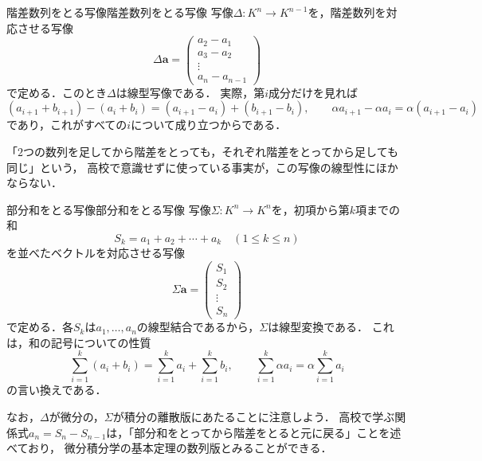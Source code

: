 \begin{example}{階差数列をとる写像}{階差数列をとる写像}
  写像$\Delta \colon K^n \to K^{n-1}$を，階差数列を対応させる写像
  \[
    \Delta \bm{a} =
    \begin{pmatrix}
      a_2 - a_1 \\ a_3 - a_2 \\ \vdots \\ a_n - a_{n-1}
    \end{pmatrix}
  \]
  で定める．このとき$\Delta$は線型写像である．
  実際，第$i$成分だけを見れば
  \[
    (a_{i+1} + b_{i+1}) - (a_i + b_i) = (a_{i+1} - a_i) + (b_{i+1} - b_i), \qquad
    \alpha a_{i+1} - \alpha a_i = \alpha (a_{i+1} - a_i)
  \]
  であり，これがすべての$i$について成り立つからである．

  「$2$つの数列を足してから階差をとっても，それぞれ階差をとってから足しても同じ」という，
  高校で意識せずに使っている事実が，この写像の線型性にほかならない．
\end{example}

\begin{example}{部分和をとる写像}{部分和をとる写像}
  写像$\Sigma \colon K^n \to K^n$を，初項から第$k$項までの和
  \[
    S_k = a_1 + a_2 + \cdots + a_k \quad (1 \le k \le n)
  \]
  を並べたベクトルを対応させる写像
  \[
    \Sigma \bm{a} = \begin{pmatrix} S_1 \\ S_2 \\ \vdots \\ S_n \end{pmatrix}
  \]
  で定める．各$S_k$は$a_1, \dots, a_n$の線型結合であるから，$\Sigma$は線型変換である．
  これは，和の記号についての性質
  \[
    \sum_{i=1}^{k} (a_i + b_i) = \sum_{i=1}^{k} a_i + \sum_{i=1}^{k} b_i, \qquad
    \sum_{i=1}^{k} \alpha a_i = \alpha \sum_{i=1}^{k} a_i
  \]
  の言い換えである．

  なお，$\Delta$が微分の，$\Sigma$が積分の離散版にあたることに注意しよう．
  高校で学ぶ関係式$a_n = S_n - S_{n-1}$は，「部分和をとってから階差をとると元に戻る」ことを述べており，
  微分積分学の基本定理の数列版とみることができる．
\end{example}

